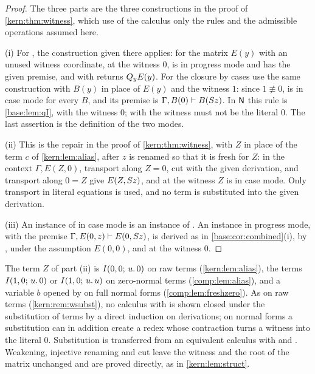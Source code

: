 \begin{proof}
The three parts are the three constructions in the proof of
\cref{kern:thm:witness}, which use of the calculus only the rules and the
admissible operations assumed here.

(i) For , the construction given there applies: 
for the matrix $E(y)$ with an unused witness coordinate, at the witness
$0$, is in progress mode and has the given premise, and  with
 returns $Q_{y}E(y)$. For the closure by cases use the same
construction with $B(y)$ in place of $E(y)$ and the witness $1$: since
$1\not\equiv0$,  is in case mode for every $B$, and its premise
is $\Gamma,B(0)\vdash B(S z)$. In $\mathsf{N}$ this rule is
\cref{base:lem:qI}, with the witness $0$; with  the witness
must not be the literal $0$. The last assertion is the definition of the
two modes.

(ii) This is the repair in the proof of \cref{kern:thm:witness}, with $Z$ in
place of the term $c$ of \cref{kern:lem:alias}, after $z$ is renamed so that
it is fresh for $Z$: in the context $\Gamma,E(Z,0)$, transport along $Z=0$,
cut with the given derivation, and transport along $0=Z$ give
$E(Z,S z)$, and  at the witness $Z$ is in case mode. Only
transport in literal equations is used, and no term is substituted into the
given derivation.

(iii) An instance of  in case mode is an instance of
. An instance in progress mode, with the premise
$\Gamma,E(0,z)\vdash E(0,S z)$, is derived as in
\cref{base:cor:combined}(i), by ,  under the
assumption $E(0,0)$, and  at the witness $0$.
\end{proof}

\begin{remark}
\label{comp:rem:single}
The term $Z$ of part (ii) is $I(0,0;\,u.\,0)$ on raw terms
(\cref{kern:lem:alias}), the terms $I(1,0;\,u.\,0)$ or $I(1,0;\,u.\,u)$ on
zero-normal terms (\cref{comp:lem:alias}), and a variable $b$ opened by
 on full normal forms (\cref{comp:lem:freshzero}). As on raw
terms (\cref{kern:rem:wsubst}), no calculus with  is shown
closed under the substitution of terms by a direct induction on
derivations; on normal forms a substitution can in addition create a redex
whose contraction turns a witness into the literal $0$. Substitution is
transferred from an equivalent calculus with  and
. Weakening, injective renaming and cut leave the witness and
the root of the matrix unchanged and are proved directly, as in
\cref{kern:lem:struct}.
\end{remark}

